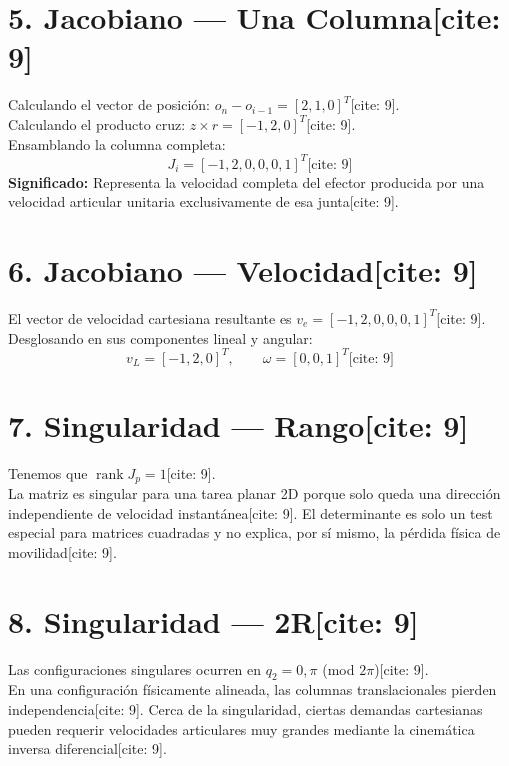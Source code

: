 \documentclass[11pt, a4paper]{article}
\begin{document}
\section*{5. Jacobiano — Una Columna[cite: 9]}
Calculando el vector de posición: $o_n - o_{i-1} = [2, 1, 0]^T$[cite: 9]. \\
Calculando el producto cruz: $z \times r = [-1, 2, 0]^T$[cite: 9]. \\
Ensamblando la columna completa:
\begin{equation*}
    \boxed{ J_i = [-1, 2, 0, 0, 0, 1]^T } \text{[cite: 9]}
\end{equation*}
\textbf{Significado:} Representa la velocidad completa del efector producida por una velocidad articular unitaria exclusivamente de esa junta[cite: 9].

\section*{6. Jacobiano — Velocidad[cite: 9]}
El vector de velocidad cartesiana resultante es $v_e = [-1, 2, 0, 0, 0, 1]^T$[cite: 9]. \\
Desglosando en sus componentes lineal y angular:
\begin{equation*}
    v_L = [-1, 2, 0]^T, \qquad \omega = [0, 0, 1]^T \text{[cite: 9]}
\end{equation*}

\section*{7. Singularidad — Rango[cite: 9]}
Tenemos que $\operatorname{rank}J_p = 1$[cite: 9]. \\
La matriz es singular para una tarea planar 2D porque solo queda una dirección independiente de velocidad instantánea[cite: 9]. El determinante es solo un test especial para matrices cuadradas y no explica, por sí mismo, la pérdida física de movilidad[cite: 9].

\section*{8. Singularidad — 2R[cite: 9]}
Las configuraciones singulares ocurren en $q_2 = 0, \pi$ (mod $2\pi$)[cite: 9]. \\
En una configuración físicamente alineada, las columnas translacionales pierden independencia[cite: 9]. Cerca de la singularidad, ciertas demandas cartesianas pueden requerir velocidades articulares muy grandes mediante la cinemática inversa diferencial[cite: 9].
\end{document}
